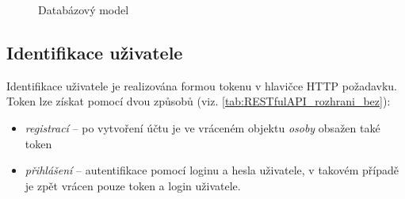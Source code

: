 \documentclass[thesis=B,czech]{FITthesis}[2012/06/26]
\begin{document}
\begin{figure}
	\caption{Databázový model}\label{fig:gtd_database_model}
\end{figure}

\subsection{Identifikace uživatele}
\label{realization:user_autentorization}
Identifikace uživatele je realizována formou tokenu v hlavičce HTTP požadavku. Token lze získat pomocí dvou způsobů (viz. \ref{tab:RESTfulAPI_rozhrani_bez}):
\begin{itemize}[nosep]
	\item \textit{registrací} -- po vytvoření účtu je ve vráceném objektu \textit{osoby} obsažen také token
	\item \textit{přihlášení} -- autentifikace pomocí loginu a hesla uživatele, v takovém případě je zpět vrácen pouze token a login uživatele.
\end{itemize}
\end{document}
